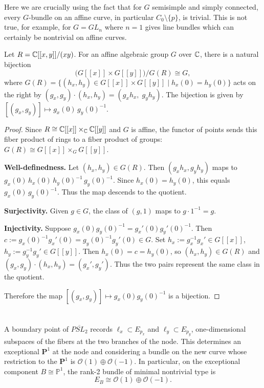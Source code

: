 \documentclass[12pt]{article}
\begin{document}
Here we are crucially using the fact that for $G$ semisimple and simply connected, every $G$-bundle on an affine curve, in particular $C_0\setminus\{p\}$, is trivial. This is not true, for example, for $G=GL_n$ where $n=1$ gives line bundles which can certainly be nontrivial on affine curves. 


\begin{proposition}
Let $R = \mathbb{C}[[x,y]]/(xy)$. For an affine algebraic group $G$ over $\mathbb{C}$, there is a natural bijection
\[
\bigl(G[[x]] \times G[[y]]\bigr) / G(R) \cong G,
\]
where $G(R) = \{(h_x,h_y) \in G[[x]] \times G[[y]] \mid h_x(0)=h_y(0)\}$ acts on the right by $(g_x,g_y)\cdot(h_x,h_y)=(g_xh_x,\;g_yh_y)$. The bijection is given by $[(g_x,g_y)] \mapsto g_x(0)\,g_y(0)^{-1}$.
\end{proposition}

\begin{proof}
Since $R \cong \mathbb{C}[[x]] \times_{\mathbb{C}} \mathbb{C}[[y]]$ and $G$ is affine, the functor of points sends this fiber product of rings to a fiber product of groups: $G(R) \cong G[[x]] \times_{G} G[[y]]$. 

\textbf{Well-definedness.} Let $(h_x,h_y)\in G(R)$. Then $(g_xh_x,g_yh_y)$ maps to $g_x(0)\,h_x(0)\,h_y(0)^{-1}\,g_y(0)^{-1}$. Since $h_x(0)=h_y(0)$, this equals $g_x(0)\,g_y(0)^{-1}$. Thus the map descends to the quotient.

\textbf{Surjectivity.} Given $g\in G$, the class of $(g,1)$ maps to $g\cdot 1^{-1}=g$.

\textbf{Injectivity.} Suppose $g_x(0)g_y(0)^{-1}=g_x'(0)g_y'(0)^{-1}$. Then $c:=g_x(0)^{-1}g_x'(0)=g_y(0)^{-1}g_y'(0)\in G$. Set $h_x := g_x^{-1}g_x' \in G[[x]]$, $h_y := g_y^{-1}g_y' \in G[[y]]$. Then $h_x(0)=c=h_y(0)$, so $(h_x,h_y)\in G(R)$ and $(g_x,g_y)\cdot(h_x,h_y)=(g_x',g_y')$. Thus the two pairs represent the same class in the quotient.

Therefore the map $[(g_x,g_y)] \mapsto g_x(0)g_y(0)^{-1}$ is a bijection.
\end{proof}


\section{}
A boundary point of $\overline{PSL_2}$ records $\ell_x \subset E_{p_x}$ and $\ell_y \subset E_{p_y}$, one-dimensional subspaces of the fibers at the two branches of the node. This determines an exceptional $\mathbf{P}^1$ at the node and considering a bundle on the new curve whose restriction to the $\mathbf{P}^1$ is $\mathcal{O}(1) \oplus \mathcal{O}(-1)$. In particular, on the exceptional component $B \cong \mathbb{P}^1$, the rank-2 bundle of minimal nontrivial type is
\[
E_B \cong \mathcal{O}(1) \oplus \mathcal{O}(-1).
\]
\end{document}
